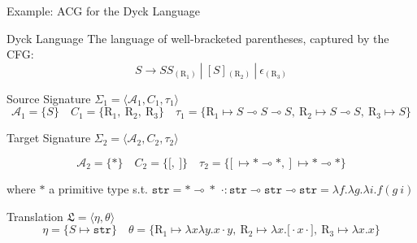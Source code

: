 \documentclass{beamer}
\newcommand{\li}{\!\multimap\!}
\begin{document}
\begin{frame}{Example: ACG for the Dyck Language}
	\small
	\begin{block}{Dyck Language}
		The language of well-bracketed parentheses, captured by the CFG:
		\[
			S \to SS {}_{(\mathrm{R}_1)} \ | \  [S]  {}_{(\mathrm{R}_2)} \ | \ \epsilon {}_{(\mathrm{R}_3)}
		\]
	\end{block}
	\pause

	\alert{Source Signature} $\Sigma_1 = \langle \mathcal{A}_1, C_1, \tau_1 \rangle$
	{\footnotesize
	\[
	\mathcal{A}_1 = \{S\}  
	\quad  C_1= \{\mathrm{R}_1,\ \mathrm{R}_2,\ \mathrm{R}_3\} 
	\quad \tau_1 = \{ \mathrm{R}_1 \mapsto S\li S\li S, 
		\ \mathrm{R}_2 \mapsto S\li S,
		\ \mathrm{R}_3 \mapsto S\}
	\]}
	\pause

	\alert{Target Signature} $\Sigma_2 = \langle \mathcal{A}_2, C_2, \tau_2 \rangle$
	{\footnotesize
	\[
	\mathcal{A}_2 = \{ * \}
	\quad  C_2= \{ \texttt{[},\ \texttt{]} \} 
	\quad \tau_2 = \{ \texttt{[} \ \mapsto * \li *,\ \texttt{]} \ \mapsto * \li *\}
	\]
	\begin{flushright}
		where $*$ a primitive type s.t. $\texttt{str}=*\li *$
		$\cdot: \texttt{str}\li \texttt{str}\li \texttt{str} = \lambda f.\lambda g.\lambda i.f(g \ i)$
	\end{flushright}		
	}
	\pause
	
	\alert{Translation} $\mathfrak{L} = \langle \eta, \theta \rangle$
	{\footnotesize
	\[
	\eta = \{ S \mapsto \texttt{str}\} \quad 
	\theta = \{ \mathrm{R}_1 \mapsto \lambda x \lambda y.x\cdot y,
	 \ \mathrm{R}_2 \mapsto \lambda x.\texttt{[} \cdot x \cdot \texttt{]},
	 \ \mathrm{R}_3 \mapsto \lambda x.x
	\}
	\]
	}
\end{frame}
\end{document}
